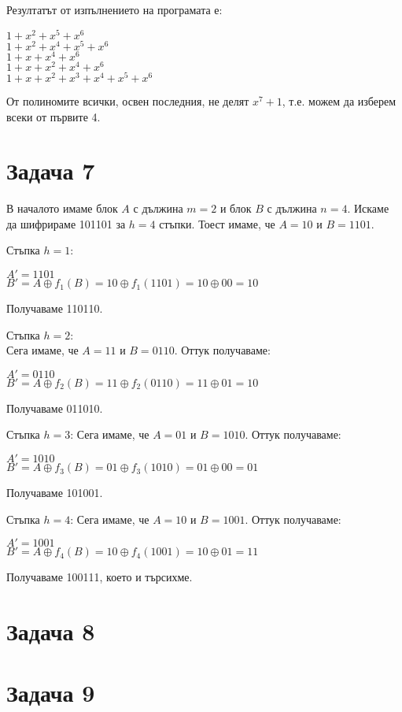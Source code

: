 \documentclass{article}
\begin{document}
\justify
Резултатът от изпълнението на програмата е:

\begin{center}
$1+x^2+x^5+x^6$ \\
$1+x^2+x^4+x^5+x^6$ \\
$1+x+x^4+x^6$ \\
$1+x+x^2+x^4+x^6$ \\
$1+x+x^2+x^3+x^4+x^5+x^6$
\end{center}

\justify
От полиномите всички, освен последния, не делят $x^7 + 1$, т.е. можем да изберем всеки от първите 4.

\section*{Задача 7}

\justify
В началото имаме блок $A$ с дължина $m = 2$ и блок $B$ с дължина $n = 4$. Искаме да шифрираме 101101 за $h = 4$ стъпки. Тоест имаме, че $A = 10$ и $B = 1101$.

\justify
Стъпка $h = 1$:
\begin{center}
    $A' = 1101$ \\
    $B' = A \oplus f_1(B) = 10 \oplus f_1(1101) = 10 \oplus 00 = 10$
\end{center}
Получаваме 110110.

\justify
Стъпка $h = 2$: \\
Сега имаме, че $A = 11$ и $B = 0110$. Оттук получаваме:
\begin{center}
    $A' = 0110$ \\
    $B' = A \oplus f_2(B) = 11 \oplus f_2(0110) = 11 \oplus 01 = 10$
\end{center}
Получаваме 011010.

\justify
Стъпка $h = 3$:
Сега имаме, че $A = 01$ и $B = 1010$. Оттук получаваме:
\begin{center}
    $A' = 1010$ \\
    $B' = A \oplus f_3(B) = 01 \oplus f_3(1010) = 01 \oplus 00 = 01$
\end{center}
Получаваме 101001.

\justify
Стъпка $h = 4$:
Сега имаме, че $A = 10$ и $B = 1001$. Оттук получаваме:
\begin{center}
    $A' = 1001$ \\
    $B' = A \oplus f_4(B) = 10 \oplus f_4(1001) = 10 \oplus 01 = 11$
\end{center}
Получаваме 100111, което и търсихме.

\section*{Задача 8}

\section*{Задача 9}
\end{document}
